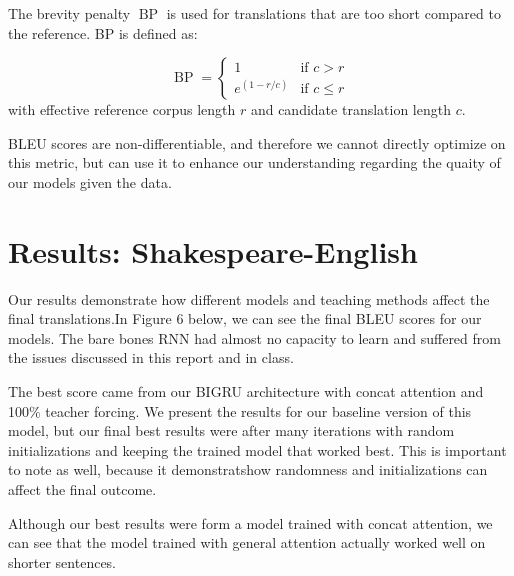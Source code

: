 \documentclass[twoside,twocolumn]{article}
\begin{document}
The brevity penalty $\operatorname{BP}$ is used for translations that are
too short compared to the reference. BP is defined as:

\begin{equation}
  \operatorname{BP} = \begin{cases}
    1 & \text{if } c > r \\
    e^{(1-r/c)} & \text{if } c \leq r
  \end{cases}
\end{equation}
\noindent
with effective reference corpus length $r$ and candidate translation length $c$.

BLEU scores are non-differentiable, and therefore we cannot directly optimize
on this metric, but can use it to enhance our understanding regarding the
quaity of our models given the data.

\section{Results: Shakespeare-English}
Our results demonstrate how different models and teaching methods affect the 
final translations.In Figure 6 below, we can see the final BLEU scores for our
models. The bare bones RNN had almost no capacity to learn and suffered from
the issues discussed in this report and in class.

The best score came from our BIGRU architecture with concat attention and 100\%
teacher forcing. We present the results for our baseline version of this model,
but our final best results were after many iterations with random 
initializations and keeping the trained model that worked best. This is 
important to note as well, because it demonstratshow randomness and 
initializations can affect the final outcome.

Although our best results were form a model trained with concat attention, we
can see that the model trained with general attention actually worked well on
shorter sentences. 

\label{sec:results}
\end{document}
